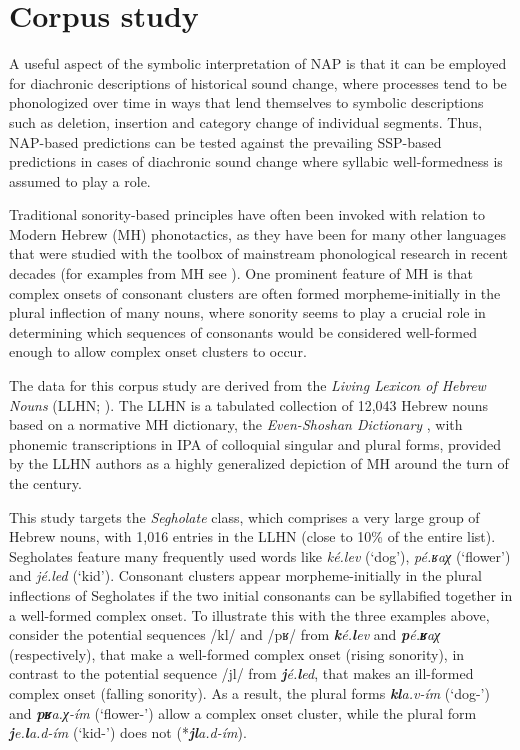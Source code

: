 \chapter{Corpus study}\label{sec:diachronic}

A useful aspect of the symbolic interpretation of NAP is that it can be employed for diachronic descriptions of historical sound change, where processes tend to be phonologized over time in ways that lend themselves to symbolic descriptions such as deletion, insertion and category change of individual segments. Thus, NAP-based predictions can be tested against the prevailing SSP-based predictions in cases of diachronic sound change where syllabic well-formedness is assumed to play a role.

Traditional sonority-based principles have often been invoked with relation to Modern Hebrew (MH) phonotactics, as they have been for many other languages that were studied with the toolbox of mainstream phonological research in recent decades (for examples from MH see \citealt{adam2002variable, asherov2019syllablesk, bat1994stemsk, bat1996selectingsk, bat2002truesk, batel2012sonoritysk, bolozky1978somesk, bolozky2006notesk, bolozky2009colloquialsk, cohen2009role, faust2014wheresk, faust2015novelsk, kreitman2008phoneticssk, laks2015paradigmsk, schwarzwald2005modernsk}).
One prominent feature of MH is that complex onsets of consonant clusters are often formed morpheme-initially in the plural inflection of many nouns, where sonority seems to play a crucial role in determining which sequences of consonants would be considered well-formed enough to allow complex onset clusters to occur.

The data for this corpus study are derived from the \emph{Living Lexicon of Hebrew Nouns} (LLHN; \citealt{bolozky2006livingsk}). The LLHN is a tabulated collection of
12,043 Hebrew nouns based on a normative MH dictionary, the \emph{Even-Shoshan Dictionary} \citep{evenshoshan2003milonsk}, with phonemic transcriptions in IPA of colloquial singular and plural forms, provided by the LLHN authors as a highly generalized depiction of MH around the turn of the century.

This study targets the \emph{Segholate} class, which comprises a very large group of Hebrew nouns, with 1,016
entries in the LLHN (close to 10\% of the entire list). Segholates feature many frequently used words like \emph{ké.lev} (`dog'), \emph{pé.ʁaχ} (`flower') and \emph{jé.led} (`kid').
Consonant clusters appear morpheme-initially in the plural inflections of Segholates if the two initial consonants can be syllabified together in a well-formed complex onset. To illustrate this with the three examples above, consider the potential sequences /kl/ and /pʁ/ from \emph{\textbf{k}é.\textbf{l}ev} and
\emph{\textbf{p}é.\textbf{ʁ}aχ}
(respectively), that make a well-formed complex onset (rising sonority), in contrast to the potential sequence /jl/ from \emph{\textbf{j}é.\textbf{l}ed}, that makes an ill-formed complex onset (falling sonority). As a result, the plural forms \emph{\textbf{kl}a.v-ím} (`dog-\Pl{}') and \emph{\textbf{pʁ}a.χ-ím} (`flower-\Pl{}') allow a complex onset cluster, while the plural form \emph{\textbf{j}e.\textbf{l}a.d-ím} (`kid-\Pl{}') does not (*\emph{\textbf{jl}a.d-ím}).

